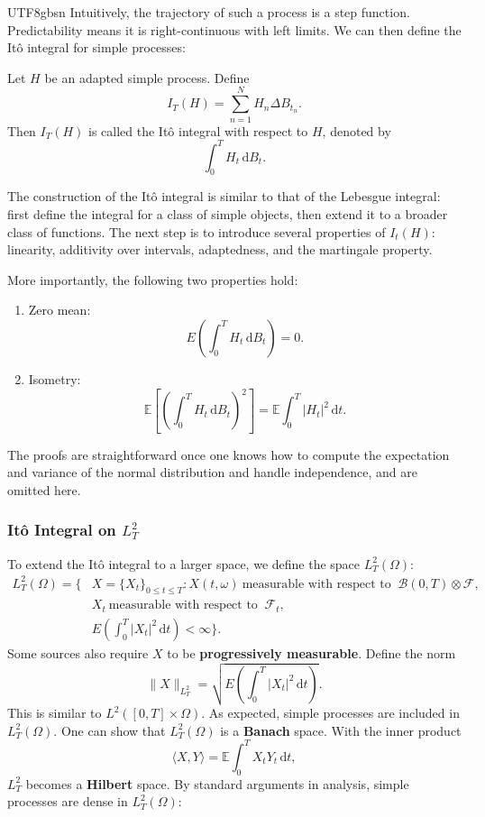 \documentclass{article}
\begin{document}
\begin{CJK*}{UTF8}{gbsn}
Intuitively, the trajectory of such a process is a step function. Predictability means it is right-continuous with left limits. We can then define the Itô integral for simple processes:

\begin{definition}
Let $H$ be an adapted simple process. Define
    $$
    I_T(H)=\sum_{n=1}^N H_n\Delta B_{t_n}.
    $$
Then $I_T(H)$ is called the Itô integral with respect to $H$, denoted by
    $$
    \int_0^T H_t\,\mathrm{d}B_t.
    $$
\end{definition}

The construction of the Itô integral is similar to that of the Lebesgue integral: first define the integral for a class of simple objects, then extend it to a broader class of functions. The next step is to introduce several properties of $I_t(H)$:
linearity, additivity over intervals, adaptedness, and the martingale property.

More importantly, the following two properties hold:
\begin{enumerate}
    \item Zero mean:
    $$E\left(\int_0^T H_t\,\mathrm{d}B_t\right)=0.$$
    \item Isometry: \label{pro2}
    $$
    \mathbb{E}\!\left[\left(\int_0^T H_t\,\mathrm{d}B_t\right)^2\right]
    =\mathbb{E}\!\int_0^T |H_t|^2\,\mathrm{d}t.
    $$
\end{enumerate}
The proofs are straightforward once one knows how to compute the expectation and variance of the normal distribution and handle independence, and are omitted here.

\subsubsection{Itô Integral on $L^2_T$}
To extend the Itô integral to a larger space, we define the space $L^2_T(\Omega)$:
$$
\begin{aligned}
L^2_T(\Omega)
=\Big\{&X=\{X_t\}_{0\le t\le T} : X(t,\omega)\ \text{measurable with respect to }\ \mathcal{B}(0,T)\otimes\mathcal{F}, \\
& X_t\ \text{measurable with respect to }\ \mathcal{F}_t, \\
& E\!\left(\int_0^T|X_t|^2\,\mathrm{d}t\right)<\infty\Big\}.
\end{aligned}
$$
Some sources also require $X$ to be \textbf{progressively measurable}. Define the norm
$$
\|X\|_{L_T^2}=\sqrt{E\!\left(\int_0^T|X_t|^2\,\mathrm{d}t\right)}.
$$
This is similar to $L^2([0,T]\times\Omega)$. As expected, simple processes are included in $L^2_T(\Omega)$. One can show that $L^2_T(\Omega)$ is a \textbf{Banach} space. With the inner product
$$
\langle X,Y\rangle = \mathbb{E}\!\int_0^T X_tY_t\,\mathrm{d}t,
$$
$L_T^2$ becomes a \textbf{Hilbert} space. By standard arguments in analysis, simple processes are dense in $L^2_T(\Omega)$:


\end{CJK*}
\end{document}
